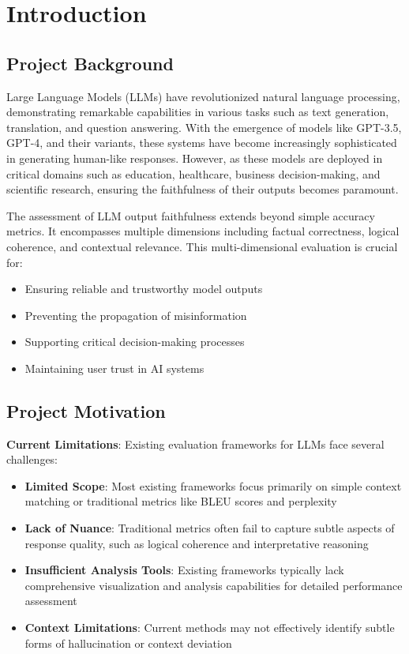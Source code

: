 \section{Introduction}

\subsection{Project Background}
Large Language Models (LLMs) have revolutionized natural language processing, demonstrating remarkable capabilities in various tasks such as text generation, translation, and question answering. With the emergence of models like GPT-3.5, GPT-4, and their variants, these systems have become increasingly sophisticated in generating human-like responses. However, as these models are deployed in critical domains such as education, healthcare, business decision-making, and scientific research, ensuring the faithfulness of their outputs becomes paramount.

\vspace{0.5em}
The assessment of LLM output faithfulness extends beyond simple accuracy metrics. It encompasses multiple dimensions including factual correctness, logical coherence, and contextual relevance. This multi-dimensional evaluation is crucial for:
\begin{itemize}
    \item Ensuring reliable and trustworthy model outputs
    \item Preventing the propagation of misinformation
    \item Supporting critical decision-making processes
    \item Maintaining user trust in AI systems
\end{itemize}

\subsection{Project Motivation}
\textbf{Current Limitations}: Existing evaluation frameworks for LLMs face several challenges:
\begin{itemize}
    \item \textbf{Limited Scope}: Most existing frameworks focus primarily on simple context matching or traditional metrics like BLEU scores and perplexity
    \item \textbf{Lack of Nuance}: Traditional metrics often fail to capture subtle aspects of response quality, such as logical coherence and interpretative reasoning
    \item \textbf{Insufficient Analysis Tools}: Existing frameworks typically lack comprehensive visualization and analysis capabilities for detailed performance assessment
    \item \textbf{Context Limitations}: Current methods may not effectively identify subtle forms of hallucination or context deviation
\end{itemize}

